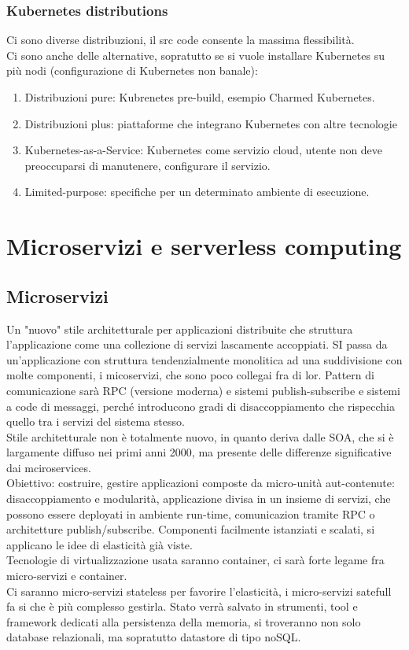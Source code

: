\documentclass{article}
\begin{document}
\subsubsection{Kubernetes distributions}
Ci sono diverse distribuzioni, il src code consente la massima flessibilità.\\ Ci sono anche delle alternative, sopratutto se si vuole installare Kubernetes su più nodi (configurazione di Kubernetes non banale):
\begin{enumerate}
\item Distribuzioni pure: Kubrenetes pre-build, esempio Charmed Kubernetes.
\item Distribuzioni plus: piattaforme che integrano Kubernetes con altre tecnologie 
\item Kubernetes-as-a-Service: Kubernetes come servizio cloud, utente non deve preoccuparsi di manutenere, configurare il servizio.
\item Limited-purpose: specifiche per un determinato ambiente di esecuzione.
\end{enumerate}
\section{Microservizi e serverless computing}
\subsection{Microservizi}
Un "nuovo" stile architetturale per applicazioni distribuite che struttura l'applicazione come una collezione di servizi lascamente accoppiati. SI passa da un'applicazione con struttura tendenzialmente monolitica ad una suddivisione con molte componenti, i micoservizi, che sono poco collegai fra di lor. Pattern di comunicazione sarà RPC (versione moderna) e sistemi publish-subscribe e sistemi a code di messaggi, perché introducono gradi di disaccoppiamento che rispecchia quello tra i servizi del sistema stesso.\\ Stile architetturale non è totalmente nuovo, in quanto deriva dalle SOA, che si è largamente diffuso nei primi anni 2000, ma presente delle differenze significative dai mciroservices.\\ Obiettivo: costruire, gestire applicazioni composte da micro-unità aut-contenute: disaccoppiamento e modularità, applicazione divisa in un insieme di servizi, che possono essere deployati in ambiente run-time, comunicazion tramite RPC o architetture publish/subscribe. Componenti facilmente istanziati e scalati, si applicano le idee di elasticità già viste.\\ Tecnologie di virtualizzazione usata saranno container, ci sarà forte legame fra micro-servizi e container.\\ Ci saranno micro-servizi stateless per favorire l'elasticità, i micro-servizi satefull fa si che è più complesso gestirla. Stato verrà salvato in strumenti, tool e framework dedicati alla persistenza della memoria, si troveranno non solo database relazionali, ma sopratutto datastore di tipo noSQL.\\ 
\end{document}
